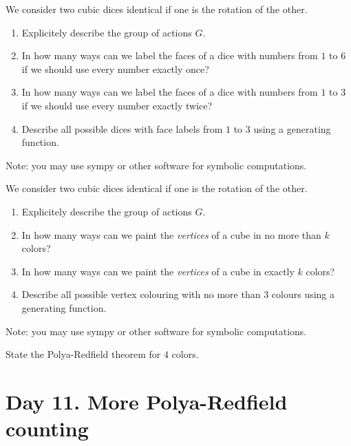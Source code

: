 \documentclass[12pt]{article}
\begin{document}
\begin{exercise}
    We consider two cubic dices identical if one is the rotation of the other. 

    \begin{enumerate}[label=\alph*)]
        \item Explicitely describe the group of actions $G$. 
        \item In how many ways can we label the faces of a dice with numbers from $1$ to $6$ if we should use every number exactly once?
        \item In how many ways can we label the faces of a dice with numbers from $1$ to $3$ if we should use every number exactly twice?
        \item Describe all possible dices with face labels from $1$ to $3$ using a generating function.
    \end{enumerate}
    Note: you may use sympy or other software for symbolic computations.
\end{exercise}


\begin{exercise}
    We consider two cubic dices identical if one is the rotation of the other. 

    \begin{enumerate}[label=\alph*)]
        \item Explicitely describe the group of actions $G$. 
        \item In how many ways can we paint the \emph{vertices} of a cube in no more than $k$ colors?
        \item In how many ways can we paint the \emph{vertices} of a cube in exactly $k$ colors?
        \item Describe all possible vertex colouring with no more than $3$ colours using a generating function.
    \end{enumerate}
    Note: you may use sympy or other software for symbolic computations.
\end{exercise}




\begin{exercise}
    State the Polya-Redfield theorem for $4$ colors. 
\end{exercise}


\section{Day 11. More Polya-Redfield counting}
\end{document}

